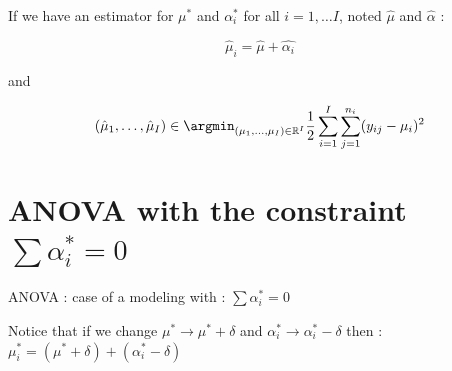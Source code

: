 \documentclass[unknownkeysallowed]{beamer}
\begin{document}
\begin{frame}
\rem
If we have an estimator for $\mu^*$ and $\alpha_i^*$ for all $i=1,\dots I$, noted $\hat{\mu}$ and $\hat{\alpha}$ : 

\[\hat{\mu}_i=  \hat{\mu} +  \hat{\alpha_i}  \]

and 

\begin{equation}\label{eq:sep}
(\hat{\mu}_1, \dots, \hat{\mu}_I) \in \argmin_{(\mu_1,\dots,\mu_I)\in \mathbb{R}^I} \frac{1}{2} \sum_{i=1}^I \sum_{j=1}^{n_i}(y_{ij}-\mu_i)^2
\end{equation}

\end{frame}



\section{ANOVA with the constraint $\sum\alpha^*_i=0$}

\begin{frame}{ANOVA : case of a modeling with  : $\sum\alpha^*_i=0$}

Notice that if we change $\mu^*\longrightarrow \mu^*+\delta$ and $\alpha^*_i\longrightarrow \alpha^*_i-\delta$ then : $\mu_i^*=(\mu^* + \delta)+(\alpha_i^*-\delta)$

\begin{itemize}\setlength{\itemsep}{5pt}
\end{itemize}

\end{frame}
\end{document}
